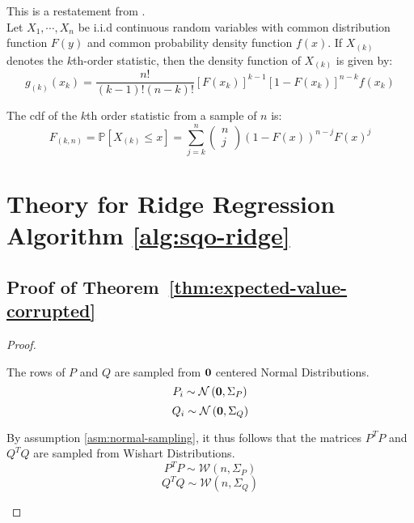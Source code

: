 \documentclass{article} %
\begin{document}
\begin{appendices}
	\begin{fact}
		This is a restatement from \cite{Wackerly2008}.\\
		Let $X_1,\cdots, X_n$ be i.i.d continuous random variables with common distribution function $F(y)$ and common probability density function $f(x)$. If $X_{(k)}$ denotes the $k$th-order statistic, then the density function of $X_{(k)}$ is given by:
		\begin{equation}
			g_{(k)}(x_k) = \frac{n!}{(k-1)!(n-k)!}[F(x_k)]^{k-1}[1 - F(x_k)]^{n-k}f(x_k)
		\end{equation}
	\end{fact}

	\begin{fact}
		The cdf of the $k$th order statistic from a sample of $n$ is:
		\begin{equation}
			F_{(k,n)} = \mathbb{P}\left[X_{(k)}\leq x \right] = \sum_{j=k}^n \begin{pmatrix} n \\ j\end{pmatrix} \left(1 - F(x)\right)^{n-j} F(x)^j
		\end{equation}
	\end{fact}

	\newpage
	
	\section{Theory for Ridge Regression Algorithm \ref{alg:sqo-ridge}}\label{app:sub-quantile-optimization}
	\subsection{Proof of Theorem~\ref{thm:expected-value-corrupted}}\label{app:expected-value-corrupted}
	\begin{proof}
	\begin{assumption}\label{asm:normal-sampling}
		The rows of $P$ and $Q$ are sampled from ${\bm{0}}$ centered Normal Distributions.
		\begin{equation*}
			P_i \sim \mathcal{N}\left({\bm{0}}, \Sigma_P\right)
		\end{equation*}
		\begin{equation}
			Q_i \sim \mathcal{N}\left({\bm{0}}, \Sigma_Q\right)
		\end{equation}
	\end{assumption}
	
	\begin{assumption}\label{asm:wishart}
		By assumption \ref{asm:normal-sampling}, it thus follows that the matrices $P^T P$ and $Q^T Q$ are sampled from Wishart Distributions.
		\begin{equation}
			P^T P \sim \mathcal{W}\left(n,\Sigma_P\right)
		\end{equation}
		\begin{equation}
			Q^T Q \sim \mathcal{W}\left(n, \Sigma_Q\right)
		\end{equation}
	\end{assumption}


\end{proof}
\end{appendices}
\end{document}
